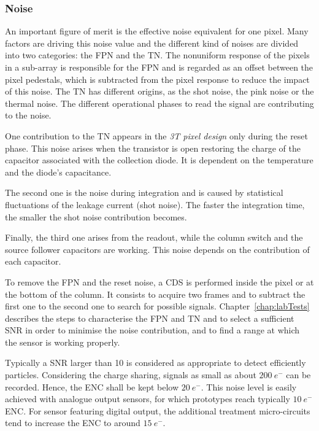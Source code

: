     \subsubsection{Noise}

    An important figure of merit is the effective noise equivalent for one pixel.
    Many factors are driving this noise value and the different kind of noises are divided into two categories: the \gls{FPN} and the \gls{TN}.
    The nonuniform response of the pixels in a sub-array is responsible for the \gls{FPN} and is regarded as an offset between the pixel pedestals, which is subtracted from the pixel response to reduce the impact of this noise.
    The \gls{TN} has different origins, as the shot noise, the pink noise or the thermal noise.
    The different operational phases to read the signal are contributing to the noise.
    
    One contribution to the \gls{TN} appears in the \textit{3T pixel design} only during the reset phase.
    This noise arises when the transistor is open restoring the charge of the capacitor associated with the collection diode.
    It is dependent on the temperature and the diode's capacitance.
    
    The second one is the noise during integration and is caused by statistical fluctuations of the leakage current (shot noise).
    The faster the integration time, the smaller the shot noise contribution becomes.
    
    Finally, the third one arises from the readout, while the column switch and the source follower capacitors are working.
    This noise depends on the contribution of each capacitor.
    
    To remove the \gls{FPN} and the reset noise, a \gls{CDS} is performed inside the pixel or at the bottom of the column.
    It consists to acquire two frames and to subtract the first one to the second one to search for possible signals.
    Chapter~\ref{chap:labTests} describes the steps to characterise the \gls{FPN} and \gls{TN} and to select a sufficient \gls{SNR} in order to minimise the noise contribution, and to find a range at which the sensor is working properly.

    Typically a \gls{SNR} larger than 10 is considered as appropriate to detect efficiently particles.
    Considering the charge sharing, signals as small as about $200~e^{-}$ can be recorded. 
    Hence, the \gls{ENC} shall be kept below $20~e^{-}$. 
    This noise level is easily achieved with analogue output sensors, for which prototypes reach typically $10~e^{-}$ \gls{ENC}.
    For sensor featuring digital output, the additional treatment micro-circuits tend to increase the \gls{ENC} to around $15~e^{-}$.

